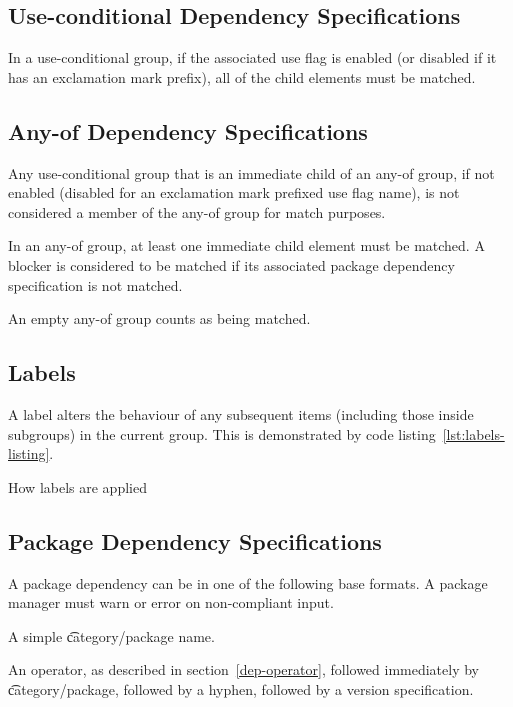 \subsection{Use-conditional Dependency Specifications}

In a use-conditional group, if the associated use flag is enabled (or disabled if it has an
exclamation mark prefix), all of the child elements must be matched.

\subsection{Any-of Dependency Specifications}

Any use-conditional group that is an immediate child of an any-of group, if not enabled (disabled
for an exclamation mark prefixed use flag name), is not considered a member of the any-of group
for match purposes.

In an any-of group, at least one immediate child element must be matched. A blocker is
considered to be matched if its associated package dependency specification is not matched.

An empty any-of group counts as being matched.

\IFKDEBUILDELSE
{
    \subsection{Labels}
    \label{labels}

    A label alters the behaviour of any subsequent items (including those inside subgroups) in the
    current group. This is demonstrated by code listing~\ref{lst:labels-listing}.

\begin{listing}
  \caption{How labels are applied}\label{lst:labels-listing}
  
\end{listing}
}{
}

\subsection{Package Dependency Specifications}

A package dependency can be in one of the following base formats. A package manager must warn or
error on non-compliant input.

\begin{compactitem}
\item A simple \t{category/package} name.
\item An operator, as described in section~\ref{dep-operator}, followed immediately by
    \t{category/package}, followed by a hyphen, followed by a version specification.
\end{compactitem}

